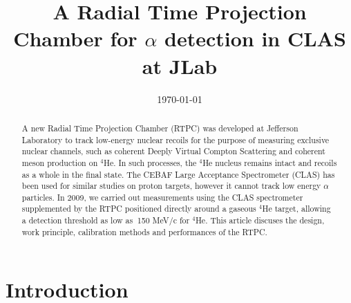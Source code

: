 \documentclass[twocolumn,showpacs,superscriptaddress,groupedaddress]{revtex4}
\begin{document}

\title{\vspace{-15mm}\fontsize{24pt}{10pt}\selectfont\textbf{A Radial Time 
Projection Chamber for $\alpha$ detection in CLAS at JLab}}
  

\date{\today}

\begin{abstract}
A new Radial Time Projection Chamber (RTPC) was developed at Jefferson 
Laboratory to track low-energy nuclear recoils for the purpose of measuring
exclusive nuclear channels, such as coherent Deeply Virtual Compton Scattering
and coherent meson production on $^4$He. In such processes, the $^4$He nucleus
remains intact and recoils as a whole in the final state. The CEBAF Large
Acceptance Spectrometer (CLAS) has been used for similar studies on proton
targets, however it cannot track low energy $\alpha$ particles. In
2009, we carried out measurements using the CLAS spectrometer supplemented by
the RTPC positioned directly around a gaseous $^4$He target, allowing a detection
threshold as low as $~$150  MeV/c for $^4$He. This article discuses the design,
work principle, calibration methods and performances of the RTPC.
\end{abstract}

\maketitle


\section{Introduction} \label{sec:level1}
\end{document}
